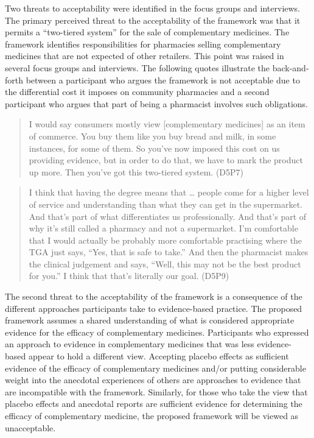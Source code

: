 \documentclass[11pt,a4paper]{article}
\begin{document}
Two threats to acceptability were identified in the focus groups and
interviews. The primary perceived threat to the acceptability of the
framework was that it permits a ``two-tiered system'' for the sale of
complementary medicines. The framework identifies responsibilities for
pharmacies selling complementary medicines that are not expected of
other retailers. This point was raised in several focus groups and
interviews. The following quotes illustrate the back-and-forth between a
participant who argues the framework is not acceptable due to the
differential cost it imposes on community pharmacies and a second
participant who argues that part of being a pharmacist involves such
obligations.

\begin{quote}
I would say consumers mostly view {[}complementary medicines{]} as an
item of commerce. You buy them like you buy bread and milk, in some
instances, for some of them. So you've now imposed this cost on us
providing evidence, but in order to do that, we have to mark the product
up more. Then you've got this two-tiered system. (D5P7)
\end{quote}

\begin{quote}
I think that having the degree means that \ldots{} people come for a
higher level of service and understanding than what they can get in the
supermarket. And that's part of what differentiates us professionally.
And that's part of why it's still called a pharmacy and not a
supermarket. I'm comfortable that I would actually be probably more
comfortable practising where the TGA just says, ``Yes, that is safe to
take.'' And then the pharmacist makes the clinical judgement and says,
``Well, this may not be the best product for you.'' I think that that's
literally our goal. (D5P9)
\end{quote}

The second threat to the acceptability of the framework is a consequence
of the different approaches participants take to evidence-based
practice. The proposed framework assumes a shared understanding of what
is considered appropriate evidence for the efficacy of complementary
medicines. Participants who expressed an approach to evidence in
complementary medicines that was less evidence-based appear to hold a
different view. Accepting placebo effects as sufficient evidence of the
efficacy of complementary medicines and/or putting considerable weight
into the anecdotal experiences of others are approaches to evidence that
are incompatible with the framework. Similarly, for those who take the
view that placebo effects and anecdotal reports are sufficient evidence
for determining the efficacy of complementary medicine, the proposed
framework will be viewed as unacceptable.
\end{document}

